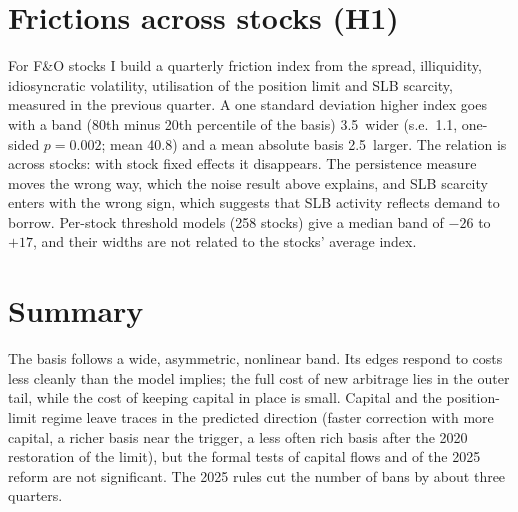\section{Frictions across stocks (H1)}
For F\&O stocks I build a quarterly friction index from the spread, illiquidity, idiosyncratic volatility, utilisation of
the position limit and SLB scarcity, measured in the previous quarter. A one standard deviation higher index goes with a
band (80th minus 20th percentile of the basis) 3.5\bp\ wider (s.e.\ 1.1, one-sided $p=0.002$; mean 40.8\bp) and a mean
absolute basis 2.5\bp\ larger. The relation is across stocks: with stock fixed effects it disappears. The persistence
measure moves the wrong way, which the noise result above explains, and SLB scarcity enters with the wrong sign, which
suggests that SLB activity reflects demand to borrow. Per-stock threshold models (258 stocks) give a median band of $-26$ to
$+17$\bp, and their widths are not related to the stocks' average index.

\section{Summary}
The basis follows a wide, asymmetric, nonlinear band. Its edges respond to costs less cleanly than the model implies; the
full cost of new arbitrage lies in the outer tail, while the cost of keeping capital in place is small. Capital and the
position-limit regime leave traces in the predicted direction (faster correction with more capital, a richer basis near
the trigger, a less often rich basis after the 2020 restoration of the limit), but the formal tests of capital flows and of
the 2025 reform are not significant. The 2025 rules cut the number of bans by about three quarters.

